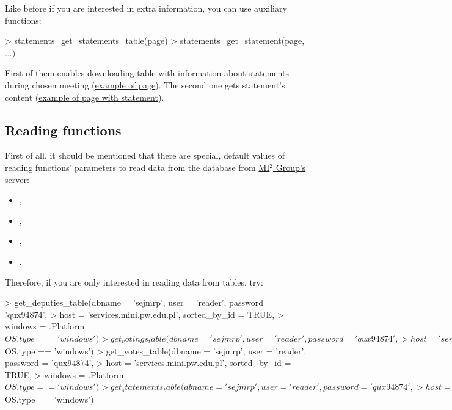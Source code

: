 Like before if you are interested in extra information, you can use auxiliary functions:

\begin{example}
> statements_get_statements_table(page)
> statements_get_statement(page, ...)
\end{example}

First of them enables downloading table with information about statements during chosen meeting (\href{http://www.sejm.gov.pl/Sejm7.nsf/posiedzenie.xsp?posiedzenie=99&dzien=2}{example of page}). The second one gets statement's content (\href{http://www.sejm.gov.pl/Sejm7.nsf/wypowiedz.xsp?posiedzenie=99&dzien=2&wyp=10}{example of page with statement}).

\subsection{Reading functions}

First of all, it should be mentioned that there are special, default values of reading functions' parameters to read data from the database from \href{http://mi2.mini.pw.edu.pl}{MI$^2$ Group's} server:

\begin{itemize}
\item {},
\item {},
\item {},
\item {}.
\end{itemize}

Therefore, if you are only interested in reading data from tables, try:

\begin{example}
> get_deputies_table(dbname = 'sejmrp', user = 'reader', password = 'qux94874', 
>	host = 'services.mini.pw.edu.pl', sorted_by_id = TRUE,
>	windows = .Platform$OS.type == 'windows')
> get_votings_table(dbname = 'sejmrp', user = 'reader', password = 'qux94874', 
>	host = 'services.mini.pw.edu.pl', sorted_by_id = TRUE,
>	windows = .Platform$OS.type == 'windows')
> get_votes_table(dbname = 'sejmrp', user = 'reader', password = 'qux94874', 
>	host = 'services.mini.pw.edu.pl', sorted_by_id = TRUE,
>	windows = .Platform$OS.type == 'windows')
> get_statements_table(dbname = 'sejmrp', user = 'reader', password = 'qux94874', 
>	host = 'services.mini.pw.edu.pl', sorted_by_id = TRUE,
>	windows = .Platform$OS.type == 'windows')
\end{example}

